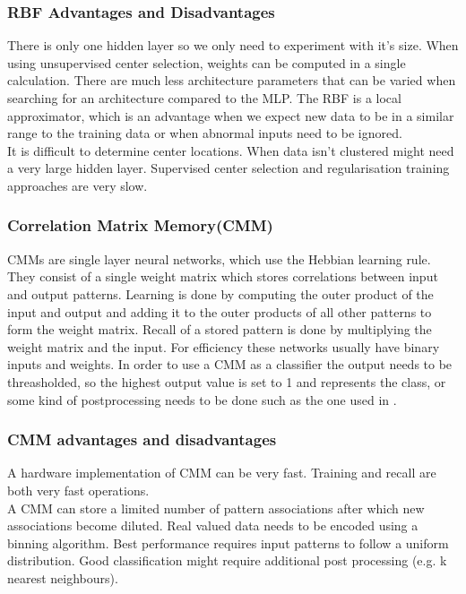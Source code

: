 \documentclass[a4paper, 11pt]{article}
\begin{document}
\subsubsection*{RBF Advantages and Disadvantages}
There is only one hidden layer so we only need to experiment with it's size. When using unsupervised center selection, weights can be computed in a single calculation. There are much less architecture parameters that can be varied when searching for an  architecture compared to the MLP. The RBF is a local approximator, which is an advantage when we expect new data to be in a similar range to the training data or when abnormal inputs need to be ignored. \\
It is difficult to determine center locations. When data isn't clustered might need a very large hidden layer.  Supervised center selection and regularisation training approaches are very slow. 

\subsubsection*{Correlation Matrix Memory(CMM)}
CMMs are single layer neural networks, which use the Hebbian learning rule. They consist of a single weight matrix which stores correlations between input and output patterns. Learning is done by computing the outer product of the input and output and adding it to the outer products of all other patterns to form the weight matrix. Recall of a stored pattern is done by multiplying the weight matrix and the input. For efficiency these networks usually have binary inputs and weights. In order to use a CMM as a classifier the output needs to be threasholded, so the highest output value is set to 1 and represents the class, or some kind of postprocessing needs to be done such as the one used in \cite{Zhou1998}.  
\subsubsection*{CMM advantages and disadvantages}
A hardware implementation of CMM can be very fast. Training and recall are both very fast operations. \\
A CMM can store a limited number of pattern associations after which new associations become diluted. Real valued data needs to be encoded using a binning algorithm. Best performance requires input patterns to follow a uniform distribution. Good classification might require additional post processing (e.g. k nearest neighbours).
\end{document}
